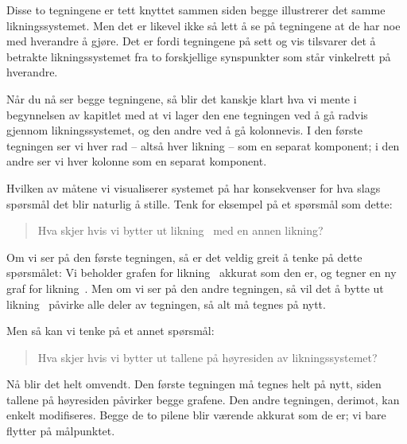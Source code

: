Disse to tegningene er tett knyttet sammen siden begge illustrerer det
samme likningssystemet.  Men det er likevel ikke så lett å se på
tegningene at de har noe med hverandre å gjøre.  Det er fordi
tegningene på sett og vis tilsvarer det å betrakte likningssystemet
fra to forskjellige synspunkter som står vinkelrett på hverandre.

Når du nå ser begge tegningene, så blir det kanskje klart hva vi mente
i begynnelsen av kapitlet med at vi lager den ene tegningen ved å gå
radvis gjennom likningssystemet, og den andre ved å gå kolonnevis.  I
den første tegningen ser vi hver rad -- altså hver likning -- som en
separat komponent; i den andre ser vi hver kolonne som en separat
komponent.

Hvilken av måtene vi visualiserer systemet på har konsekvenser for hva
slags spørsmål det blir naturlig å stille.  Tenk for eksempel på et
spørsmål som dette:
\begin{quote}
Hva skjer hvis vi bytter ut likning~\To{} med en annen likning?
\end{quote}
Om vi ser på den første tegningen, så er det veldig greit å tenke på
dette spørsmålet: Vi beholder grafen for likning~\En{} akkurat som den
er, og tegner en ny graf for likning~\To.  Men om vi ser på den andre
tegningen, så vil det å bytte ut likning~\To{} påvirke alle deler av
tegningen, så alt må tegnes på nytt.

Men så kan vi tenke på et annet spørsmål:
\begin{quote}
Hva skjer hvis vi bytter ut tallene på høyresiden av likningssystemet?
\end{quote}
Nå blir det helt omvendt.  Den første tegningen må tegnes helt på
nytt, siden tallene på høyresiden påvirker begge grafene.  Den andre
tegningen, derimot, kan enkelt modifiseres.  Begge de to pilene blir
værende akkurat som de er; vi bare flytter på målpunktet.


